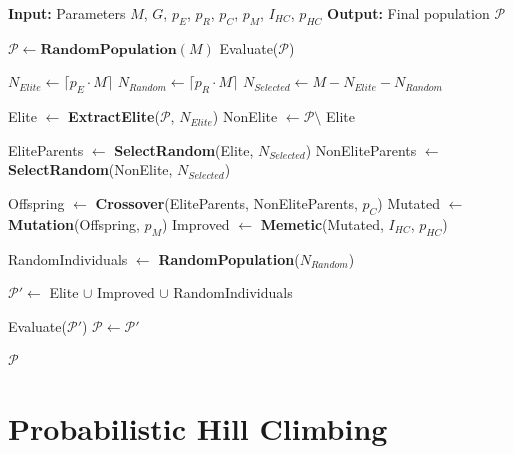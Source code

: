 \begin{algorithm}[htbp]
\centering
\begin{minipage}{0.95\linewidth}
\begin{algorithmic}[1]
\State \textbf{Input:} Parameters $M$, $G$, $p_E$, $p_R$, $p_C$, $p_M$, $I_{HC}$, $p_{HC}$
\State \textbf{Output:} Final population $\mathcal{P}$

\State $\mathcal{P} \gets \textbf{RandomPopulation}(M)$
\State Evaluate($\mathcal{P}$)

\State $N_{Elite} \gets \lceil p_E \cdot M \rceil$ 
\State $N_{Random} \gets \lceil p_R \cdot M \rceil$ 
\State $N_{Selected} \gets M - N_{Elite} - N_{Random}$ 


    \State Elite $\gets$ \textbf{ExtractElite}($\mathcal{P}$, $N_{Elite}$) 
    \State NonElite $\gets \mathcal{P} \setminus$ Elite 

    \State EliteParents $\gets$ \textbf{SelectRandom}(Elite, $N_{Selected}$) 
    \State NonEliteParents $\gets$ \textbf{SelectRandom}(NonElite, $N_{Selected}$) 

    \State Offspring $\gets$ \textbf{Crossover}(EliteParents, NonEliteParents, $p_C$) 
    \State Mutated $\gets$ \textbf{Mutation}(Offspring, $p_M$) 
    \State Improved $\gets$ \textbf{Memetic}(Mutated, $I_{HC}$, $p_{HC}$) 

    \State RandomIndividuals $\gets$ \textbf{RandomPopulation}($N_{Random}$) 

    \State $\mathcal{P}' \gets$ Elite $\cup$ Improved $\cup$ RandomIndividuals

    \State Evaluate($\mathcal{P}'$)
    \State $\mathcal{P} \gets \mathcal{P}'$

\EndFor

\State \Return $\mathcal{P}$
\end{algorithmic}
\end{minipage}
\caption{Elitist Genetic Algorithm Pseudocode}
\label{alg:ega-pseudocode}
\end{algorithm}

\section{Probabilistic Hill Climbing}

